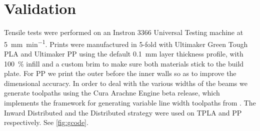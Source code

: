 \section{Validation}
Tensile tests were performed on an Instron 3366 Universal Testing machine at \SI{5}{\milli\meter\per\minute}.
Prints were manufactured in 5-fold with Ultimaker Green Tough PLA and Ultimaker PP using the default \SI{0.1}{\milli\meter} layer thickness profile,
with \SI{100}{\percent} infill and a custom brim to make sure both materials stick to the build plate.
For PP we print the outer before the inner walls so as to improve the dimensional accuracy. %
In order to deal with the various widths of the beams we generate toolpaths using the Cura Arachne Engine beta release\cite{CuraArachne},
which implements the framework for generating variable line width toolpaths from \cite{Kuipers2020}.
The Inward Distributed and the Distributed strategy were used on TPLA and PP respectively.
See \cref{fig:gcode}.



